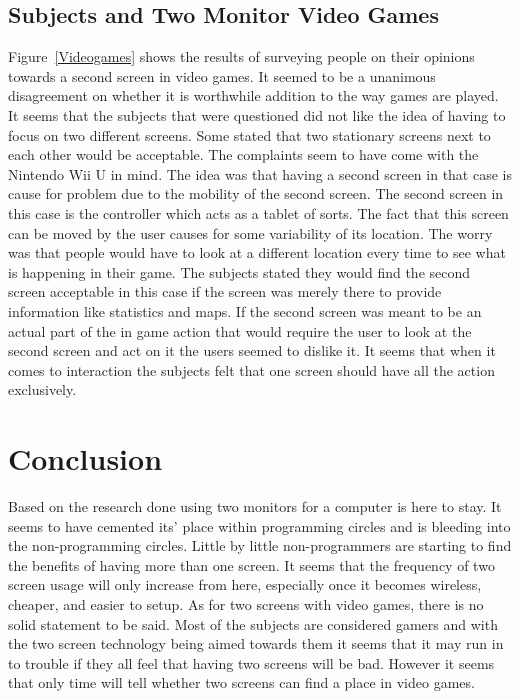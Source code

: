 \documentclass[11pt]{article}
\begin{document}
\subsection{Subjects and Two Monitor Video Games}
Figure~\ref{Videogames} shows the results of surveying people on their opinions towards a second screen in video games. It seemed to be a unanimous disagreement on whether it is worthwhile addition to the way games are played. It seems that the subjects that were questioned did not like the idea of having to focus on two different screens. Some stated that two stationary screens next to each other would be acceptable. The complaints seem to have come with the Nintendo Wii U in mind. The idea was that having a second screen in that case is cause for problem due to the mobility of the second screen. The second screen in this case is the controller which acts as a tablet of sorts. The fact that this screen can be moved by the user causes for some variability of its location. The worry was that people would have to look at a different location every time to see what is happening in their game. The subjects stated they would find the second screen acceptable in this case if the screen was merely there to provide information like statistics and maps. If the second screen was meant to be an actual part of the in game action that would require the user to look at the second screen and act on it the users seemed to dislike it. It seems that when it comes to interaction the subjects felt that one screen should have all the action exclusively.

\section{Conclusion}
Based on the research done using two monitors for a computer is here to stay. It seems to have cemented its’ place within programming circles and is bleeding into the non-programming circles. Little by little non-programmers are starting to find the benefits of having more than one screen. It seems that the frequency of two screen usage will only increase from here, especially once it becomes wireless, cheaper, and easier to setup. As for two screens with video games, there is no solid statement to be said. Most of the subjects are considered gamers and with the two screen technology being aimed towards them it seems that it may run in to trouble if they all feel that having two screens will be bad. However it seems that only time will tell whether two screens can find a place in video games.

{}

\end{document}
